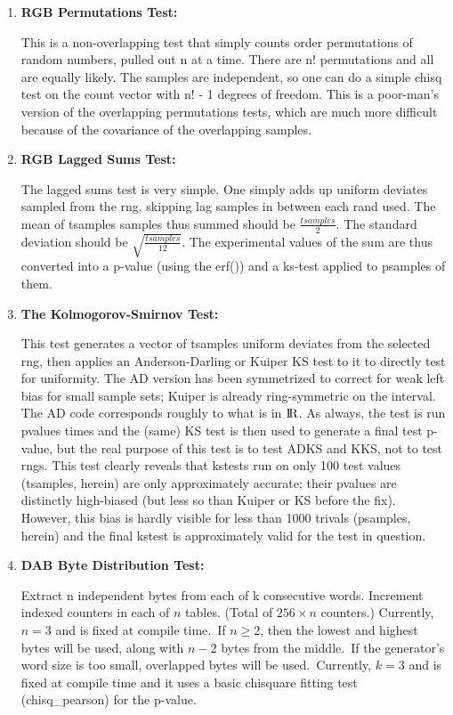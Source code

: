 \documentclass[titlepage, 11pt]{article}
\begin{document}
\begin{enumerate}
\item \textbf{RGB Permutations Test:} 


This is a non-overlapping test that simply counts order permutations of
random numbers, pulled out n at a time.  There are n! permutations
and all are equally likely.  The samples are independent, so one can
do a simple chisq test on the count vector with n! - 1 degrees of
freedom.  This is a poor-man's version of the overlapping permutations
tests, which are much more difficult because of the covariance of the
overlapping samples.


\item \textbf{RGB Lagged Sums Test:} 


The lagged sums test is very simple.   One simply adds up
uniform deviates sampled from the rng, skipping lag samples in between
each rand used.  The mean of tsamples samples thus summed should be
$\frac{tsamples}{2}$.  The standard deviation should be $\sqrt{\frac{tsamples}{12}}$.
The experimental values of the sum are thus converted into a
p-value (using the erf()) and a ks-test applied to psamples of them.


\item \textbf{The Kolmogorov-Smirnov Test:}


This test generates a vector of tsamples uniform deviates from the
selected rng, then applies an Anderson-Darling or Kuiper KS test to
it to directly test for uniformity.  The AD version has been symmetrized
to correct for weak left bias for small sample sets; Kuiper is already
ring-symmetric on the interval.  The AD code corresponds roughly to
what is in ${\rm I\!R}$. As always, the test is run pvalues times and the (same) KS test is then
used to generate a final test p-value, but the real purpose of this test
is to test ADKS and KKS, not to test rngs.  This test clearly reveals
that kstests run on only 100 test values (tsamples, herein) are only
approximately accurate; their pvalues are distinctly high-biased (but
less so than Kuiper or KS before the fix).  However, this bias is hardly visible
for less than 1000 trivals (psamples, herein) and the final kstest is approximately valid for the
test in question.


\item \textbf{DAB Byte Distribution Test:} 


Extract n independent bytes from each of k consecutive words. Increment
indexed counters in each of $n$ tables.  (Total of $256 \times n$ counters.)
Currently, $n = 3$ and is fixed at compile time.\
If $n \geq 2$, then the lowest and highest bytes will be used, along
with $n-2$ bytes from the middle.\
If the generator's word size is too small, overlapped bytes will
be used.\
Currently, $k=3$ and is fixed at compile time and it uses a basic chisquare fitting test (chisq\_pearson) for the p-value.



\end{enumerate}
\end{document}
